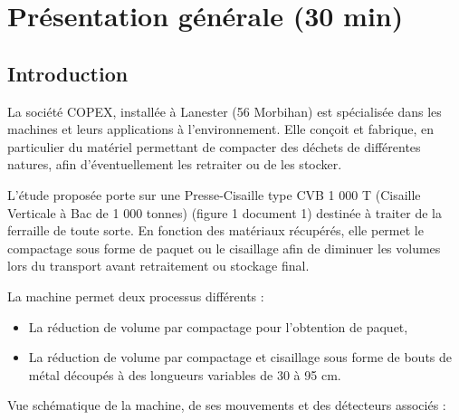 

\section{Présentation générale (30 min)}

\subsection{Introduction}

La société COPEX, installée à Lanester (56 Morbihan) est spécialisée dans les machines et leurs applications à l'environnement. Elle conçoit et fabrique, en particulier du matériel permettant de compacter des déchets de différentes natures, afin d'éventuellement les retraiter ou de les stocker.

L'étude proposée porte sur une Presse-Cisaille type CVB 1 000 T (Cisaille Verticale à Bac de 1 000 tonnes) (figure 1 document 1) destinée à traiter de la ferraille de toute sorte. En fonction des matériaux récupérés, elle permet le compactage sous forme de paquet ou le cisaillage afin de diminuer les volumes lors du transport avant retraitement ou stockage final.

La machine permet deux processus différents :
\begin{itemize}
 \item La réduction de volume par compactage pour l'obtention de paquet,
 \item La réduction de volume par compactage et cisaillage sous forme de bouts de métal découpés à des longueurs variables de 30 à 95 cm.
\end{itemize}

Vue schématique de la machine, de ses mouvements et des détecteurs associés :

